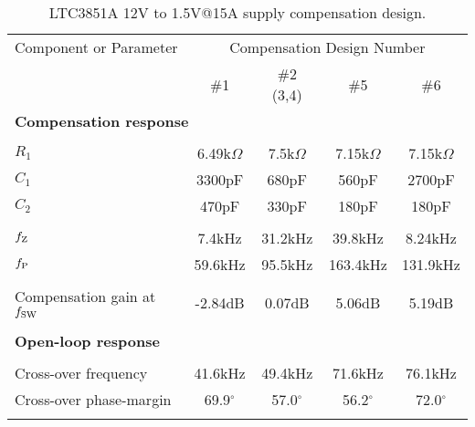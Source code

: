 \clearpage
%
\begin{table}[p]
\caption{LTC3851A 12V to 1.5V@15A supply compensation design.}
\label{fig:LTC3851A_ex1_compensation}
\begin{center}
\begin{tabular}{|l|c|c|c|c|}
\hline
\rule{0cm}{4mm}Component or Parameter & \multicolumn{4}{c|}{Compensation Design Number}\\
\cline{2-5}
\rule{0cm}{4mm}     & \#1 & \#2 (3,4) & \#5 & \#6\\
\hline
\hline
\multicolumn{5}{|l|}{\bf Compensation response}\\
\hline
& \hspace {20mm} &  \hspace {20mm} &  \hspace {20mm} &  \hspace {20mm} \\
$R_1$       & 6.49k$\Omega$ &  7.5k$\Omega$ &  7.15k$\Omega$ &  7.15k$\Omega$\\
$C_1$       & 3300pF        &  680pF        &  560pF         &  2700pF       \\
$C_2$       &  470pF        &  330pF        &  180pF         &  180pF        \\
&&&&\\
$f_{\rm Z}$ &  7.4kHz       & 31.2kHz       & 39.8kHz        &  8.24kHz       \\
$f_{\rm P}$ & 59.6kHz       & 95.5kHz       & 163.4kHz       & 131.9kHz      \\
&&&&\\
Compensation gain at $f_{\rm SW}$ & -2.84dB & 0.07dB & 5.06dB & 5.19dB\\
&&&&\\
\hline
\multicolumn{5}{|l|}{\bf Open-loop response}\\
\hline
&&&&\\
Cross-over frequency    & 41.6kHz      & 49.4kHz      & 71.6kHz      & 76.1kHz      \\ 
Cross-over phase-margin & 69.9$^\circ$ & 57.0$^\circ$ & 56.2$^\circ$ & 72.0$^\circ$ \\
&&&&\\
\hline
\end{tabular}
\end{center}
\end{table}


